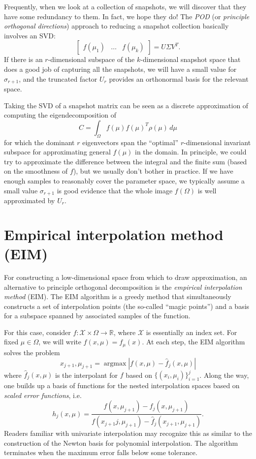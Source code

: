 \documentclass[12pt, leqno]{article} %
\begin{document}
Frequently, when we look at a collection of snapshots, we will
discover that they have some redundancy to them.  In fact, we hope
they do!  The {\em POD} (or {\em principle orthogonal directions})
approach to reducing a snapshot collection basically involves an SVD:
\[
  \begin{bmatrix} f(\mu_1) & \ldots & f(\mu_k) \end{bmatrix} = U \Sigma V^T.
\]
If there is an $r$-dimensional subspace of the $k$-dimensional
snapshot space that does a good job of capturing all the snapshots, we
will have a small value for $\sigma_{r+1}$, and the truncated factor
$U_r$ provides an orthonormal basis for the relevant space.

Taking the SVD of a snapshot matrix can be seen as a discrete
approximation of computing the eigendecomposition of
\[
  C = \int_{\Omega} f(\mu) f(\mu)^T \rho(\mu) \, d\mu
\]
for which the dominant $r$ eigenvectors span the ``optimal''
$r$-dimensional invariant subspace for approximating general $f(\mu)$ in
the domain.  In principle, we could try to approximate the difference
between the integral and the finite sum (based on the smoothness of
$f$), but we usually don't bother in practice.  If we have enough
samples to reasonably cover the parameter space, we typically assume a
small value $\sigma_{r+1}$ is good evidence that the whole image
$f(\Omega)$ is well approximated by $U_r$.

\section{Empirical interpolation method (EIM)}

For constructing a low-dimensional space from which to draw
approximation, an alternative to principle orthogonal decomposition is
the {\em empirical interpolation method} (EIM).  The EIM algorithm is
a greedy method that simultaneously constructs a set of interpolation
points (the so-called ``magic points'') and a basis for a
subspace spanned by associated samples of the function.

For this case, consider
$f : \mathcal{X} \times \mathcal{\Omega} \rightarrow \mathbb{R}$,
where $\mathcal{X}$ is essentially an index set.  For fixed
$\mu \in \Omega$, we will write $f(x, \mu) = f_{\mu}(x)$.
At each step, the EIM algorithm solves the problem
\[
  x_{j+1}, \mu_{j+1} =
  \operatorname{argmax} |f(x, \mu) - \hat{f}_{j}(x, \mu)|
\]
where $\hat{f}_j(x, \mu)$ is the interpolant for $f$ based on
$\{(x_i, \mu_i)\}_{i=1}^j$.  Along the way, one builds up
a basis of functions for the nested interpolation spaces based on
{\em scaled error functions}, i.e.
\[
  h_j(x, \mu) =
  \frac{f(x, \mu_{j+1}) - \hat{f}_j(x, \mu_{j+1})}
       {f(x_{j+1}j, \mu_{j+1}) - \hat{f}_j(x_{j+1}, \mu_{j+1})}.
\]
Readers familiar with univariate interpolation may recognize this as
similar to the construction of the Newton basis for polynomial
interpolation.  The algorithm terminates when the maximum error falls
below some tolerance.
\end{document}
